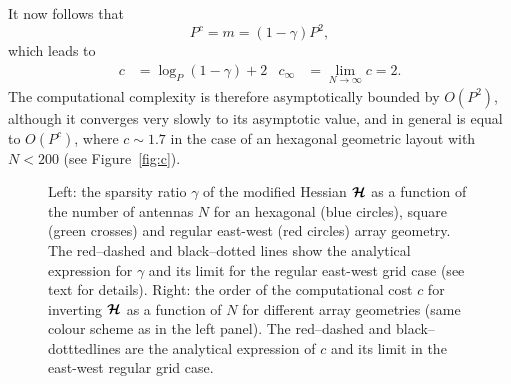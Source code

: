 \documentclass[useAMS,usenatbib]{mn2e}
\newcommand{\bmH}{\bmath{\mathcal{H}}}
\begin{document}
It now follows that 
\begin{equation}
P^{c} = m = (1 - \gamma)P^2,
\end{equation}
which leads to
\begin{align}
c &= \log_{P}(1 - \gamma) + 2 & c_{\infty} &= \lim_{N\rightarrow \infty} c = 2. \label{eq:c}
\end{align}
The computational complexity is therefore asymptotically bounded by $O(P^2)$, although it converges very slowly to its asymptotic value, and in general is equal to $O(P^{c})$, where $c \sim 1.7$ in the case of an hexagonal geometric layout with $N < 200$ (see Figure~\ref{fig:c}).

\begin{figure}
\centering
{}
\caption{Left: the sparsity ratio $\gamma$ of the modified Hessian $\bmH$ as a function of the number of antennas $N$ for an hexagonal (blue circles), square (green crosses) and regular east-west (red circles) array geometry. The red--dashed and black--dotted lines show the analytical expression for $\gamma$ and its limit for the regular east-west grid case (see text for details). Right: the order of the computational cost $c$ for inverting $\bmH$ as a function of $N$ for different array geometries (same colour scheme as in the left panel). The red--dashed and black--dotttedlines are the analytical expression of $c$ and its limit in the east-west regular grid case.
\label{fig:sparsity}} 
\end{figure}
\end{document}
